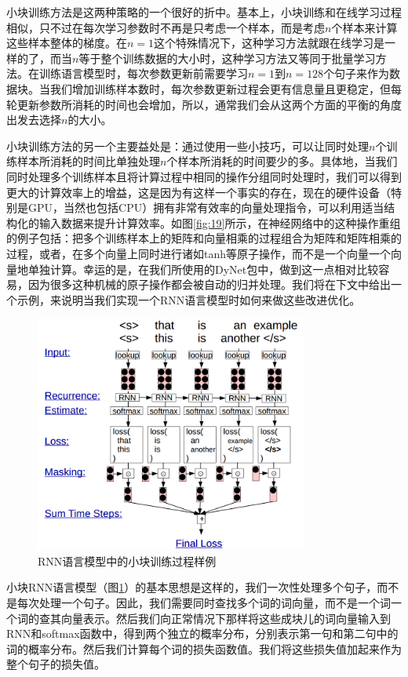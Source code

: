 \documentclass[10pt,a4paper]{ctexart}
\begin{document}
小块训练方法是这两种策略的一个很好的折中。基本上，小块训练和在线学习过程相似，只不过在每次学习参数时不再是只考虑一个样本，而是考虑$n$个样本来计算这些样本整体的梯度。在$n=1$这个特殊情况下，这种学习方法就跟在线学习是一样的了，而当$n$等于整个训练数据的大小时，这种学习方法又等同于批量学习方法。在训练语言模型时，每次参数更新前需要学习$n=1$到$n=128$个句子来作为数据块。当我们增加训练样本数时，每次参数更新过程会更有信息量且更稳定，但每轮更新参数所消耗的时间也会增加，所以，通常我们会从这两个方面的平衡的角度出发去选择$n$的大小。

小块训练方法的另一个主要益处是：通过使用一些小技巧，可以让同时处理$n$个训练样本所消耗的时间比单独处理$n$个样本所消耗的时间要少的多。具体地，当我们同时处理多个训练样本且将计算过程中相同的操作分组同时处理时，我们可以得到更大的计算效率上的增益，这是因为有这样一个事实的存在，现在的硬件设备（特别是GPU，当然也包括CPU）拥有非常有效率的向量处理指令，可以利用适当结构化的输入数据来提升计算效率。如图\ref{fig:19}所示，在神经网络中的这种操作重组的例子包括：把多个训练样本上的矩阵和向量相乘的过程组合为矩阵和矩阵相乘的过程，或者，在多个向量上同时进行诸如tanh等原子操作，而不是一个向量一个向量地单独计算。幸运的是，在我们所使用的DyNet包中，做到这一点相对比较容易，因为很多这种机械的原子操作都会被自动的归并处理。我们将在下文中给出一个示例，来说明当我们实现一个RNN语言模型时如何来做这些改进优化。

\begin{figure}[H]
\centering
\includegraphics[width=0.8\textwidth]{fig20.png}
\caption{RNN语言模型中的小块训练过程样例}
\label{fig:20}
\end{figure}

小块RNN语言模型（图\ref{fig:20}）的基本思想是这样的，我们一次性处理多个句子，而不是每次处理一个句子。因此，我们需要同时查找多个词的词向量，而不是一个词一个词的查其向量表示。然后我们向正常情况下那样将这些成块儿的词向量输入到RNN和softmax函数中，得到两个独立的概率分布，分别表示第一句和第二句中的词的概率分布。然后我们计算每个词的损失函数值。我们将这些损失值加起来作为整个句子的损失值。
\end{document}
